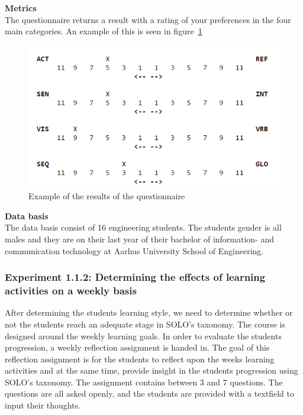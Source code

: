 \noindent\textbf{Metrics} \\
The questionnaire returns a result with a rating of your preferences in the four main categories. An example of this is seen in figure~\ref{fig:questionnaire}

\begin{figure}[H]
\centering
\includegraphics[scale=0.9]{figures/questionnaire_learning_style}
\caption{Example of the results of the questionnaire}
\label{fig:questionnaire}
\end{figure}


\noindent\textbf{Data basis}\\
The data basis consist of 16 engineering students. The students gender is all males and they are on their last year of their bachelor of information- and communication technology at Aarhus University School of Engineering. \\

\subsubsection*{Experiment 1.1.2: Determining the effects of learning activities on a weekly basis}

After determining the students learning style, we need to determine whether or not the students reach an adequate stage in SOLO's taxonomy. The course is designed around the weekly learning goals. In order to evaluate the students progression, a weekly reflection assignment is handed in. The goal of this reflection assignment is for the students to reflect upon the weeks learning activities and at the same time, provide insight in the students progression using SOLO's taxonomy. The assignment contains between 3 and 7 questions. The questions are all asked openly, and the students are provided with a textfield to input their thoughts. \\


